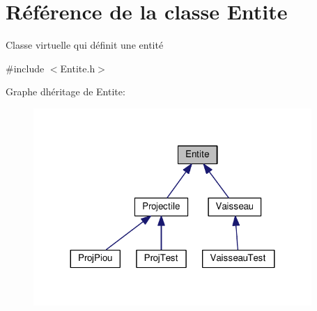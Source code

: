 \hypertarget{class_entite}{}\section{Référence de la classe Entite}
\label{class_entite}


Classe virtuelle qui définit une entité  




{\ttfamily \#include $<$Entite.\+h$>$}



Graphe d\textquotesingle{}héritage de Entite\+:\nopagebreak
\begin{figure}[H]
\begin{center}
\leavevmode
\includegraphics[width=299pt]{class_entite__inherit__graph}
\end{center}
\end{figure}

